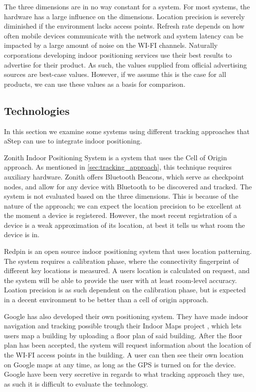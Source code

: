 The three dimensions are in no way constant for a system. For most systems, the hardware has a large influence on the dimensions. Location precision is severely diminished if the environment lacks access points. Refresh rate depends on how often mobile devices communicate with the network and system latency can be impacted by a large amount of noise on the WI-FI channels. Naturally corporations developing indoor positioning services use their best results to advertise for their product. As such, the values supplied from official advertising sources are best-case values. However, if we assume this is the case for all products, we can use these values as a basis for comparison. 

\subsection{Technologies}
In this section we examine some systems using different tracking approaches that aStep can use to integrate indoor positioning.

Zonith Indoor Positioning System is a system that uses the Cell of Origin approach. As mentioned in \cref{sec:tracking_approach}, this technique requires auxiliary hardware. Zonith offers Bluetooth Beacons, which serve as checkpoint nodes, and allow for any device with Bluetooth to be discovered and tracked\cite{zonith}. The system is not evaluated based on the three dimensions. This is because of the nature of the approach; we can expect the location precision to be excellent at the moment a device is registered. However, the most recent registration of a device is a weak approximation of its location, at best it tells us what room the device is in.

Redpin is an open source indoor positioning system that uses location patterning. The system requires a calibration phase, where the connectivity fingerprint of different key locations is measured. A users location is calculated on request, and the system will be able to provide the user with at least room-level accuracy\cite{redpin}. Loation precision is as such dependent on the calibration phase, but is expected in a decent environment to be better than a cell of origin approach. 

Google has also developed their own positioning system. They have made indoor navigation and tracking possible trough their Indoor Maps project \cite{IPSoverGPS}, which lets users map a building by uploading a floor plan of said building. After the floor plan has been accepted, the system will request information about the location of the WI-FI access points in the building\cite{googleindoormaps}. A user can then see their own location on Google maps at any time, as long as the GPS is turned on for the device. Google have been very secretive in regards to what tracking approach they use, as such it is difficult to evaluate the technology.

